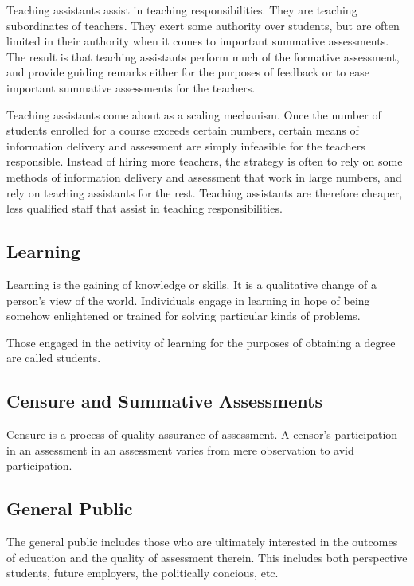 Teaching assistants assist in teaching responsibilities. They are teaching
subordinates of teachers. They exert some authority over students, but are
often limited in their authority when it comes to important summative
assessments. The result is that teaching assistants perform much of the
formative assessment, and provide guiding remarks either for the purposes of
feedback or to ease important summative assessments for the teachers.

Teaching assistants come about as a scaling mechanism. Once the number of
students enrolled for a course exceeds certain numbers, certain means of
information delivery and assessment are simply infeasible for the teachers
responsible. Instead of hiring more teachers, the strategy is often to rely on
some methods of information delivery and assessment that work in large numbers,
and rely on teaching assistants for the rest. Teaching assistants are therefore
cheaper, less qualified staff that assist in teaching responsibilities.

\subsection{Learning}

Learning is the gaining of knowledge or skills. It is a qualitative change of a
person's view of the world. Individuals engage in learning in hope of being
somehow enlightened or trained for solving particular kinds of problems.

Those engaged in the activity of learning for the purposes of obtaining a
degree are called students.

\subsection{Censure and Summative Assessments}

Censure is a process of quality assurance of assessment. A censor's
participation in an assessment in an assessment varies from mere observation to
avid participation.

\subsection{General Public}

The general public includes those who are ultimately interested in the outcomes
of education and the quality of assessment therein. This includes both
perspective students, future employers, the politically concious, etc.

